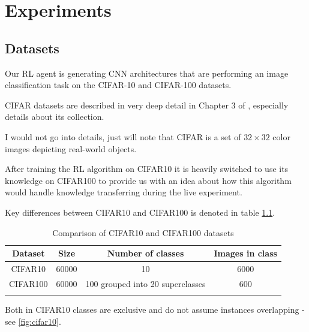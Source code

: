 \chapter{Experiments}

\section{Datasets}

Our RL agent is generating CNN architectures that are performing an image classification task on the CIFAR-10 and CIFAR-100 datasets.

CIFAR datasets are described in very deep detail in Chapter 3 of \cite{CIFAR}, especially details about its collection.

I would not go into details, just will note that CIFAR is a set of $32\times 32$ color images depicting real-world objects.

After training the RL algorithm on CIFAR10 it is heavily switched to use its knowledge on CIFAR100 to provide us with an idea about how this algorithm would handle knowledge transferring during the live experiment.

Key differences between CIFAR10 and CIFAR100 is denoted in table \ref{table:1}.

\begin{table}[h!]
\centering
\begin{tabular}{c c c c} 
 \hline
 Dataset & Size & Number of classes & Images in class \\ [0.5ex] 
 \hline
 CIFAR10 & 60000 & 10 & 6000 \\
 \hline
 CIFAR100 & 60000 & 100 grouped into 20 superclasses & 600 \\
 \hline \\ [0.5ex]
\end{tabular}
\caption{Comparison of CIFAR10 and CIFAR100 datasets}
\label{table:1}
\end{table}

Both in CIFAR10 classes are exclusive and do not assume instances overlapping - see \ref{fig:cifar10}. 

